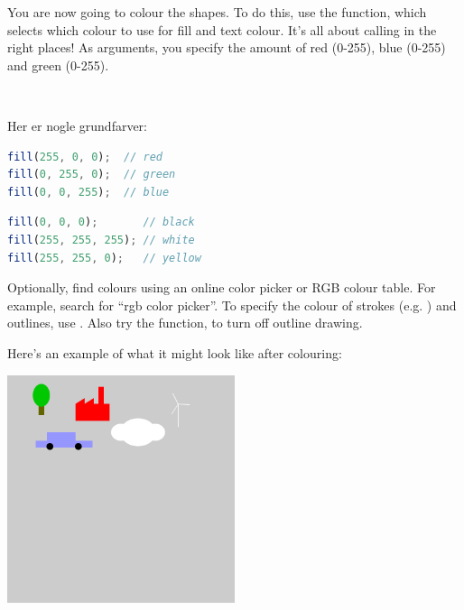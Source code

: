 \begin{exercisebox}[adjusted title=Colors]
You are now going to colour the shapes. To do this, use the
 function, which selects which colour 
to use for fill and text colour. It's all about calling
 in the right places! As arguments, you specify the amount
of red (0-255), blue (0-255) and green (0-255).

~

\noindent
Her er nogle grundfarver:

\begin{minipage}{0.45\linewidth}
\begin{lstlisting}[language=JavaScript]
fill(255, 0, 0);  // red
fill(0, 255, 0);  // green
fill(0, 0, 255);  // blue
\end{lstlisting}
\end{minipage}
\begin{minipage}{0.45\linewidth}
\begin{lstlisting}[language=JavaScript]
fill(0, 0, 0);       // black
fill(255, 255, 255); // white
fill(255, 255, 0);   // yellow
\end{lstlisting}
\end{minipage}

\noindent
Optionally, find colours using an online color picker or RGB
colour table. For example, search for ``rgb color picker''.
To specify the colour of strokes (e.g. ) and outlines, use . Also try the  function, to turn off outline drawing.
\end{exercisebox}

\newpage
\begin{exercisebox}[adjusted title=Example]
\noindent
Here's an example of what it might look like after colouring:
\begin{center}
\includegraphics[width=0.5\textwidth]{illustrationer/farvelagt.png}
\end{center}
\end{exercisebox}

